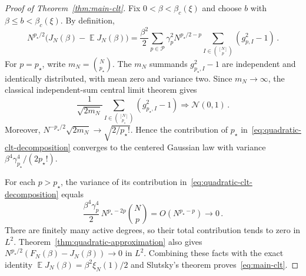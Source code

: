 \documentclass[letterpaper,11pt,reqno]{amsart}
\renewcommand{\leq}{\leqslant}
\newcommand{\cP}{\mathcal{P}}\newcommand{\cQ}{\mathcal{Q}}\newcommand{\cR}{\mathcal{R}}
\DeclareMathOperator{\E}{\mathds{E}}
\begin{document}
\begin{proof}[Proof of Theorem~\ref{thm:main-clt}]
Fix $0<\beta<\beta_c(\xi)$ and choose $b$ with $\beta\leq b<\beta_c(\xi)$. By definition,
\begin{equation}
N^{p_\star/2}\bigl(J_N(\beta)-\E J_N(\beta)\bigr)
=\frac{\beta^2}{2}\sum_{p\in\cP}\gamma_p^2N^{p_\star/2-p}
\sum_{I\in\binom{[N]}p}(g_{p,I}^2-1)\,.
\label{eq:quadratic-clt-decomposition}
\end{equation}
For $p=p_\star$, write $m_N=\binom N{p_\star}$. The $m_N$ summands $g_{p_\star,I}^2-1$ are independent and identically distributed, with mean zero and variance two. Since $m_N\to\infty$, the classical independent-sum central limit theorem gives
\begin{equation}
\frac1{\sqrt{2m_N}}\sum_{I\in\binom{[N]}{p_\star}}(g_{p_\star,I}^2-1)
\Longrightarrow\mathcal N(0,1)\,.
\label{eq:independent-square-clt}
\end{equation}
Moreover, $N^{-p_\star/2}\sqrt{2m_N}\to\sqrt{2/p_\star!}$. Hence the contribution of $p_\star$ in~\eqref{eq:quadratic-clt-decomposition} converges to the centered Gaussian law with variance $\beta^4\gamma_{p_\star}^4/(2p_\star!)$.

For each $p>p_\star$, the variance of its contribution in~\eqref{eq:quadratic-clt-decomposition} equals
\begin{equation}
\frac{\beta^4\gamma_p^4}{2}\,N^{p_\star-2p}\binom Np
=O(N^{p_\star-p})\longrightarrow0\,.
\label{eq:higher-degree-vanishing}
\end{equation}
There are finitely many active degrees, so their total contribution tends to zero in $L^2$. Theorem~\ref{thm:quadratic-approximation} also gives $N^{p_\star/2}(F_N(\beta)-J_N(\beta))\to0$ in $L^2$. Combining these facts with the exact identity $\E J_N(\beta)=\beta^2\xi_N(1)/2$ and Slutsky's theorem proves~\eqref{eq:main-clt}.
\end{proof}
\end{document}
